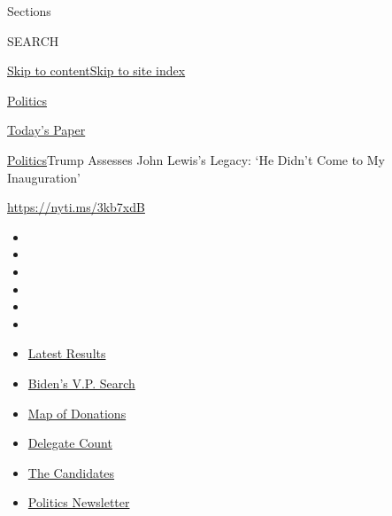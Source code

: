 Sections

SEARCH

\protect\hyperlink{site-content}{Skip to
content}\protect\hyperlink{site-index}{Skip to site index}

\href{https://www.nytimes.com/section/politics}{Politics}

\href{https://myaccount.nytimes.com/auth/login?response_type=cookie\&client_id=vi}{}

\href{https://www.nytimes.com/section/todayspaper}{Today's Paper}

\href{/section/politics}{Politics}\textbar{}Trump Assesses John Lewis's
Legacy: `He Didn't Come to My Inauguration'

\url{https://nyti.ms/3kb7xdB}

\begin{itemize}
\item
\item
\item
\item
\item
\item
\end{itemize}

\begin{itemize}
\item
  \href{https://www.nytimes.com/interactive/2020/08/04/us/elections/results-arizona-kansas-michigan-missouri-primaries.html?action=click\&pgtype=Article\&state=default\&region=TOP_BANNER\&context=storylines_menu}{Latest
  Results}
\item
  \href{https://www.nytimes.com/article/biden-vice-president-2020.html?action=click\&pgtype=Article\&state=default\&region=TOP_BANNER\&context=storylines_menu}{Biden's
  V.P. Search}
\item
  \href{https://www.nytimes.com/interactive/2020/07/24/us/politics/trump-biden-campaign-donors.html?action=click\&pgtype=Article\&state=default\&region=TOP_BANNER\&context=storylines_menu}{Map
  of Donations}
\item
  \href{https://www.nytimes.com/interactive/2020/us/elections/delegate-count-primary-results.html?action=click\&pgtype=Article\&state=default\&region=TOP_BANNER\&context=storylines_menu}{Delegate
  Count}
\item
  \href{https://www.nytimes.com/interactive/2019/us/politics/2020-presidential-candidates.html?action=click\&pgtype=Article\&state=default\&region=TOP_BANNER\&context=storylines_menu}{The
  Candidates}
\item
  \href{https://www.nytimes.com/newsletters/politics?action=click\&pgtype=Article\&state=default\&region=TOP_BANNER\&context=storylines_menu}{Politics
  Newsletter}
\end{itemize}

